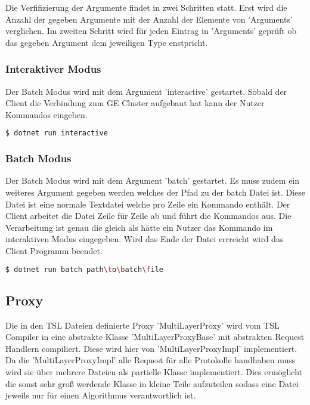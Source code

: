 Die Verfifizierung der Argumente findet in zwei Schritten statt. Erst wird die Anzahl der gegeben Argumente mit der Anzahl der Elemente von 'Arguments' verglichen.
Im zweiten Schritt wird für jeden Eintrag in 'Arguments' geprüft ob das gegeben Argument dem jeweiligen Type enstpricht.





\subsubsection{Interaktiver Modus}

Der Batch Modus wird mit dem Argument 'interactive' gestartet. Sobald der Client die Verbindung zum GE Cluster aufgebaut hat kann der Nutzer Kommandos eingeben.


\begin{lstlisting}[language=bash]
  $ dotnet run interactive
\end{lstlisting}


\subsubsection{Batch Modus}
 Der Batch Modus wird mit dem Argument 'batch' gestartet. Es muss zudem ein weiteres Argument gegeben werden welches der Pfad zu der batch Datei ist.
 Diese Datei ist eine normale Textdatei welche pro Zeile ein Kommando enthält. Der Client arbeitet die Datei Zeile für Zeile ab und führt die Kommandos aus.
 Die Verarbeitung ist genau die gleich als hätte ein Nutzer das Kommando im interaktiven Modus eingegeben. Wird das Ende der Datei errreicht wird das Client Programm beendet.

\begin{lstlisting}[language=bash]
  $ dotnet run batch path\to\batch\file 
\end{lstlisting}


\subsection{Proxy}



Die in den TSL Dateien definierte Proxy 'MultiLayerProxy' wird vom TSL Compiler in eine abstrakte Klasse 'MultiLayerProxyBase' mit abstrakten Request Handlern compiliert. Diese wird hier von 'MultiLayerProxyImpl' implementiert.
Da die 'MultiLayerProxyImpl' alle Request für alle Protokolle handhaben muss wird sie über mehrere Dateien als partielle Klasse implementiert. Dies ermöglicht die sonst sehr groß werdende Klasse in kleine Teile aufzuteilen sodass eine Datei jeweils nur für einen Algorithmus verantwortlich ist.

